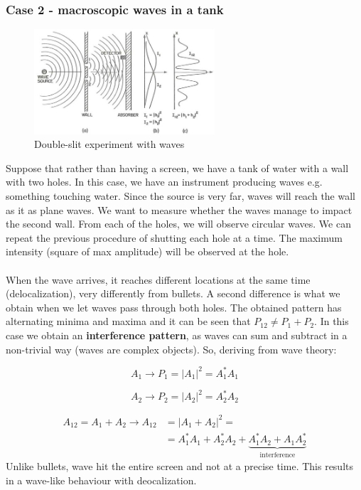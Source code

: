   
    \subsubsection{Case 2 - macroscopic waves in a tank}
     \begin{figure}[h!]
    \centering
    \includegraphics[clip, width=0.6\textwidth]{wave_ds.png}
    \caption{\label{fig:wave_ds} Double-slit experiment with waves}
\end{figure}
\noindent
Suppose that rather than having a screen, we have a tank of water with a wall with two holes. In this case, we have an instrument producing waves e.g. something touching water. Since the source is very far, waves will reach the wall as it as plane waves. We want to measure whether the waves manage to impact the second wall. From each of the holes, we will observe circular waves. We can repeat the previous procedure of shutting each hole at a time. The maximum intensity (square of max amplitude) will be observed at the hole. \\
\noindent
\\
When the wave arrives, it reaches different locations at the same time (delocalization), very differently from bullets. A second difference is what we obtain when we let waves pass through both holes. The obtained pattern has alternating minima and maxima and it can be seen that $P_{12} \neq P_1+P_2$. In this case we obtain an \textbf{interference pattern}, as waves can sum and subtract in a non-trivial way (waves are complex objects).
So, deriving from wave theory:

    $$A_1\rightarrow P_1 = |A_1|^2 = A_1^*A_1$$
      
    $$A_2\rightarrow P_2 = |A_2|^2 = A_2^*A_2$$

    \begin{align*}
      A_{12} = A_1+A_2\rightarrow A_{12} &= |A_1+A_2|^2=\\
                                         &=A_1^*A_1 + A_2^*A_2 + \underbrace{A_1^*A_2 + A_1A_2^*}_{\text{interference}}
    \end{align*}
\noindent
    Unlike bullets, wave hit the entire screen and not at a precise time.
    This results in a wave-like behaviour with deocalization.

